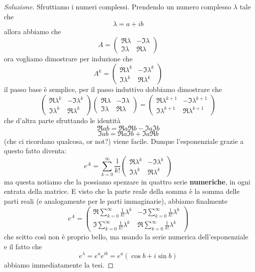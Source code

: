 \documentclass[11pt]{scrartcl}
\begin{document}
	\begin{proof}[Soluzione]
		Sfruttiamo i numeri complessi. Prendendo un numero complesso $\lambda$ tale che
		$$\lambda=a+ib$$
		allora abbiamo che 
		$$A=\begin{pmatrix}
			\Re\lambda & -\Im \lambda \\
			\Im \lambda & \Re\lambda
		\end{pmatrix}$$
		ora vogliamo dimostrare per induzione che
		$$
		A^k=
		\begin{pmatrix}
			\Re\lambda^k & -\Im\lambda^k \\
			\Im\lambda^k & \Re\lambda^k
		\end{pmatrix}
		$$
		il passo base è semplice, per il passo induttivo dobbiamo dimostrare che 
		$$
		\begin{pmatrix}
			\Re\lambda^k & -\Im\lambda^k \\
			\Im\lambda^k & \Re\lambda^k
		\end{pmatrix}
		\begin{pmatrix}
			\Re\lambda & -\Im \lambda \\
			\Im \lambda & \Re\lambda
		\end{pmatrix}
		=
		\begin{pmatrix}
			\Re\lambda^{k+1} & -\Im\lambda^{k+1} \\
			\Im\lambda^{k+1} & \Re\lambda^{k+1}
		\end{pmatrix}
		$$
		che d'altra parte sfruttando le identità
		$$\Re ab = \Re a \Re b - \Im a \Im b$$
		$$\Im ab = \Re a \Im b +\Im a \Re b$$
		(che ci ricordano qualcosa, or not?) viene facile. Dunque l'esponenziale grazie a questo fatto diventa:
		$$
		e^A=
		\sum_{k=0}^{\infty}\frac{1}{k!}
		\begin{pmatrix}
			\Re \lambda^k & -\Im\lambda^k \\
			\Im\lambda^k & \Re \lambda^k
		\end{pmatrix}
		$$
		ma questa notiamo che la possiamo spezzare in quattro serie \textbf{numeriche}, in ogni entrata della matrice. E visto che la parte reale della somma è la somma delle parti reali (e analogamente per le parti immaginarie), abbiamo finalmente
		$$e^A=\begin{pmatrix}
			\Re \sum_{k=0}^{\infty}\frac{1}{k!}\lambda^k & -\Im\sum_{k=0}^{\infty}\frac{1}{k!}\lambda^k \\
			\Im\sum_{k=0}^{\infty}\frac{1}{k!}\lambda^k & \Re \sum_{k=0}^{\infty}\frac{1}{k!}\lambda^k
		\end{pmatrix}$$
		che scitto così non è proprio bello, ma usando la serie numerica dell'esponenziale e il fatto che
		$$e^\lambda = e^a e^{ib}=e^a\left(\cos b +i\sin b\right)$$
		abbiamo immediatamente la tesi.
	\end{proof}
\end{document}

